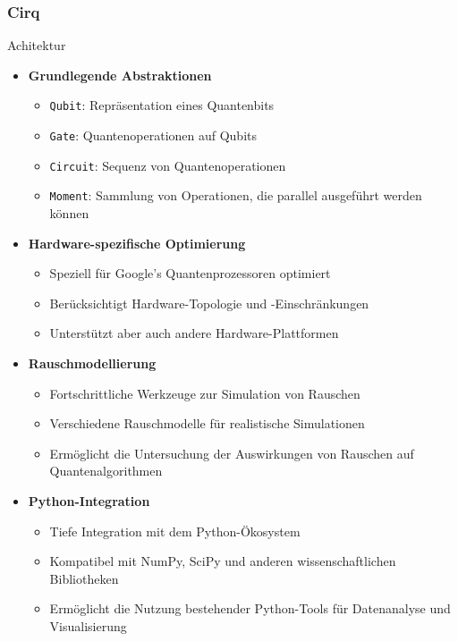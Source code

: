 \subsubsection{Cirq}
Achitektur
\begin{itemize}
    \item \textbf{Grundlegende Abstraktionen}
    \begin{itemize}
        \item \texttt{Qubit}: Repräsentation eines Quantenbits
        \item \texttt{Gate}: Quantenoperationen auf Qubits
        \item \texttt{Circuit}: Sequenz von Quantenoperationen
        \item \texttt{Moment}: Sammlung von Operationen, die parallel ausgeführt werden können
    \end{itemize}
    
    \item \textbf{Hardware-spezifische Optimierung}
    \begin{itemize}
        \item Speziell für Google's Quantenprozessoren optimiert
        \item Berücksichtigt Hardware-Topologie und -Einschränkungen
        \item Unterstützt aber auch andere Hardware-Plattformen
    \end{itemize}
    
    \item \textbf{Rauschmodellierung}
    \begin{itemize}
        \item Fortschrittliche Werkzeuge zur Simulation von Rauschen
        \item Verschiedene Rauschmodelle für realistische Simulationen
        \item Ermöglicht die Untersuchung der Auswirkungen von Rauschen auf Quantenalgorithmen
    \end{itemize}
    
    \item \textbf{Python-Integration}
    \begin{itemize}
        \item Tiefe Integration mit dem Python-Ökosystem
        \item Kompatibel mit NumPy, SciPy und anderen wissenschaftlichen Bibliotheken
        \item Ermöglicht die Nutzung bestehender Python-Tools für Datenanalyse und Visualisierung
    \end{itemize}
\end{itemize}

